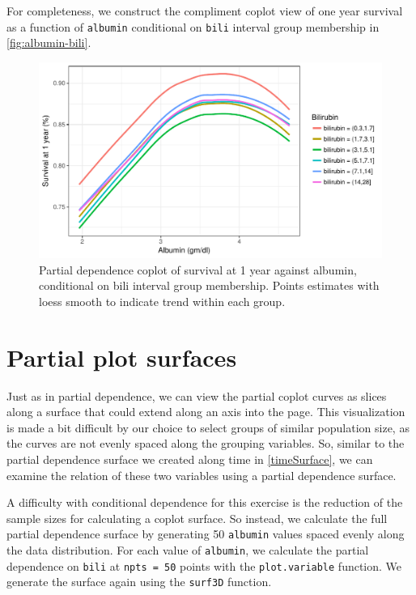 \documentclass[article, nojss]{jss}
\begin{document}
For completeness, we construct the compliment coplot view of one year
survival as a function of \texttt{albumin} conditional on \texttt{bili}
interval group membership in \autoref{fig:albumin-bili}.

\begin{Schunk}
\begin{figure}[!htb]

{\centering \includegraphics{rfs-albumin-bili-1}

}

\caption[Partial dependence coplot of survival at 1 year against albumin, conditional on bili interval group membership]{Partial dependence coplot of survival at 1 year against albumin, conditional on bili interval group membership. Points estimates with loess smooth to indicate trend within each group.}\label{fig:albumin-bili}
\end{figure}
\end{Schunk}

\section{Partial plot surfaces}\label{partial-plot-surfaces}

Just as in partial dependence, we can view the partial coplot curves as
slices along a surface that could extend along an axis into the page.
This visualization is made a bit difficult by our choice to select
groups of similar population size, as the curves are not evenly spaced
along the grouping variables. So, similar to the partial dependence
surface we created along time in \autoref{timeSurface}, we can examine
the relation of these two variables using a partial dependence surface.

A difficulty with conditional dependence for this exercise is the
reduction of the sample sizes for calculating a coplot surface. So
instead, we calculate the full partial dependence surface by generating
50 \texttt{albumin} values spaced evenly along the data distribution.
For each value of \texttt{albumin}, we calculate the partial dependence
on \texttt{bili} at \texttt{npts\ =\ 50} points with the
\texttt{plot.variable} function. We generate the surface again using the
\texttt{surf3D} function.
\end{document}
